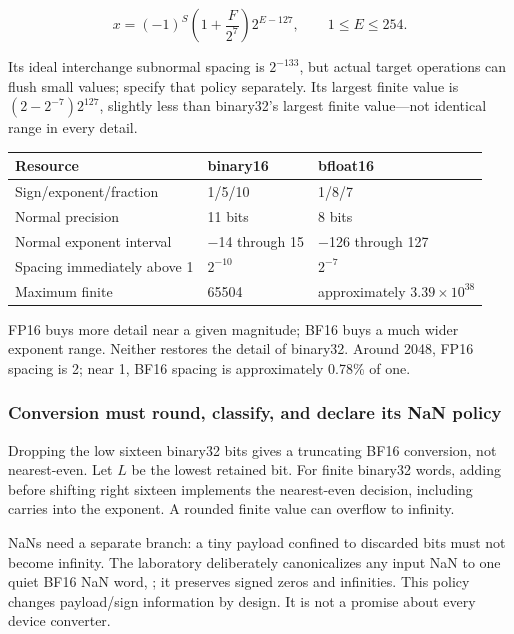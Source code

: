 \[
x=(-1)^S\left(1+\frac{F}{2^7}\right)2^{E-127},
\qquad1\le E\le254.
\]

Its ideal interchange subnormal spacing is \(2^{-133}\), but actual target operations can flush small values; specify that policy separately. Its largest finite value is \((2-2^{-7})2^{127}\), slightly less than binary32's largest finite value---not identical range in every detail.

{\def\LTcaptype{none} %
\begin{longtable}[]{@{}lll@{}}
\toprule\noalign{}
Resource & binary16 & bfloat16 \\
\midrule\noalign{}
\endhead
\bottomrule\noalign{}
\endlastfoot
Sign/exponent/fraction & 1/5/10 & 1/8/7 \\
Normal precision & 11 bits & 8 bits \\
Normal exponent interval & −14 through 15 & −126 through 127 \\
Spacing immediately above 1 & \(2^{-10}\) & \(2^{-7}\) \\
Maximum finite & 65504 & approximately \(3.39\times10^{38}\) \\
\end{longtable}
}

FP16 buys more detail near a given magnitude; BF16 buys a much wider exponent range. Neither restores the detail of binary32. Around 2048, FP16 spacing is 2; near 1, BF16 spacing is approximately 0.78\% of one.

\subsubsection{Conversion must round, classify, and declare its NaN policy}\label{01-foundations-i-ch001-conversion-must-round-classify-and-declare-its-nan-policy}

\hypertarget{01-foundations-i-ch001-conversion-must-round-classify-and-declare-its-nan-policy}{}

Dropping the low sixteen binary32 bits gives a truncating BF16 conversion, not nearest-even. Let \(L\) be the lowest retained bit. For finite binary32 words, adding  before shifting right sixteen implements the nearest-even decision, including carries into the exponent. A rounded finite value can overflow to infinity.

NaNs need a separate branch: a tiny payload confined to discarded bits must not become infinity. The laboratory deliberately canonicalizes any input NaN to one quiet BF16 NaN word, ; it preserves signed zeros and infinities. This policy changes payload/sign information by design. It is not a promise about every device converter.

